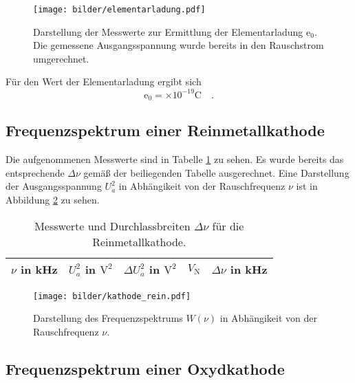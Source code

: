 	\begin{figure}
		\centering
		\texttt{[image: bilder/elementarladung.pdf]}
		\caption{Darstellung der Messwerte zur Ermittlung der 
		Elementarladung $\text{e}_0$. Die gemessene Ausgangsspannung 
		wurde bereits in den Rauschstrom umgerechnet.}
		\label{fig:elementarladung}
	\end{figure}
	
	Für den Wert der Elementarladung ergibt sich 
	\begin{equation}
	\text{e}_0 =  \times 
				10^{-19}\text{C} \quad .
	\end{equation}
	
\clearpage
\subsection{Frequenzspektrum einer Reinmetallkathode}

	Die aufgenommenen Messwerte sind in Tabelle 
	\ref{tab:kathode_rein} zu sehen. Es wurde bereits das 
	entsprechende $\Delta \nu$ gemäß der beiliegenden Tabelle 
	ausgerechnet. Eine Darstellung der Ausgangsspannung $U_a^2$ in 
	Abhängikeit von der Rauschfrequenz $\nu$ ist in Abbildung 
	\ref{fig:kathode_rein} zu sehen.
	\begin{table}
		\centering
		\begin{tabular}{ccccc}
		\toprule \midrule
		$\nu$ in kHz & $U_a^2$ in $\text{V}^2$& $\Delta U_a^2$ in   
		$\text{V}^2$& $V_\text{N}$ & $\Delta \nu$ in kHz\\
		\midrule
		
		\midrule
		\bottomrule
		\end{tabular}
		\caption{Messwerte und Durchlassbreiten $\Delta \nu$ für 
		die Reinmetallkathode.}
		\label{tab:kathode_rein}
	\end{table}

	\begin{figure}
		\centering
		\texttt{[image: bilder/kathode\_rein.pdf]}
		\caption{Darstellung des Frequenzspektrums $W(\nu)$ in 
		Abhängikeit von der Rauschfrequenz $\nu$.}
		\label{fig:kathode_rein}
	\end{figure}

\clearpage
\subsection{Frequenzspektrum einer Oxydkathode}

